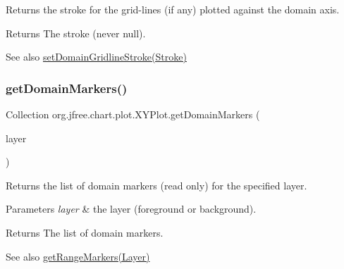 Returns the stroke for the grid-\/lines (if any) plotted against the domain axis.

\begin{DoxyReturn}{Returns}
The stroke (never {\ttfamily null}).
\end{DoxyReturn}
\begin{DoxySeeAlso}{See also}
\mbox{\hyperlink{classorg_1_1jfree_1_1chart_1_1plot_1_1_x_y_plot_ac779c1f825681fb1473651580225daf0}{set\+Domain\+Gridline\+Stroke(\+Stroke)}} 
\end{DoxySeeAlso}
\mbox{\label{classorg_1_1jfree_1_1chart_1_1plot_1_1_x_y_plot_a4c69a8c9c85f28518c9e297e51cc1cb0}} 
\subsubsection{\texorpdfstring{get\+Domain\+Markers()}{getDomainMarkers()}\hspace{0.1cm}{\footnotesize\ttfamily [1/2]}}
{\footnotesize\ttfamily Collection org.\+jfree.\+chart.\+plot.\+X\+Y\+Plot.\+get\+Domain\+Markers (\begin{DoxyParamCaption}\item[{Layer}]{layer }\end{DoxyParamCaption})}

Returns the list of domain markers (read only) for the specified layer.


\begin{DoxyParams}{Parameters}
{\em layer} & the layer (foreground or background).\\
\hline
\end{DoxyParams}
\begin{DoxyReturn}{Returns}
The list of domain markers.
\end{DoxyReturn}
\begin{DoxySeeAlso}{See also}
\mbox{\hyperlink{classorg_1_1jfree_1_1chart_1_1plot_1_1_x_y_plot_a7790ee08681555eedbc7b54c9deddb27}{get\+Range\+Markers(\+Layer)}} 
\end{DoxySeeAlso}
\mbox{\label{classorg_1_1jfree_1_1chart_1_1plot_1_1_x_y_plot_a712c78e9b5fc6a88b833b8f39ee58ad7}} 
